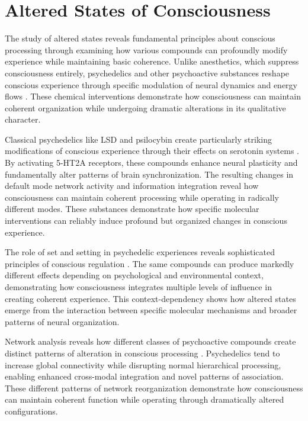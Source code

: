 \section{Altered States of Consciousness}

The study of altered states reveals fundamental principles about conscious processing through examining how various compounds can profoundly modify experience while maintaining basic coherence. Unlike anesthetics, which suppress consciousness entirely, psychedelics and other psychoactive substances reshape conscious experience through specific modulation of neural dynamics and energy flows \cite{CarhartHarris2019}. These chemical interventions demonstrate how consciousness can maintain coherent organization while undergoing dramatic alterations in its qualitative character.

Classical psychedelics like LSD and psilocybin create particularly striking modifications of conscious experience through their effects on serotonin systems \cite{Nichols2016}. By activating 5-HT2A receptors, these compounds enhance neural plasticity and fundamentally alter patterns of brain synchronization. The resulting changes in default mode network activity and information integration reveal how consciousness can maintain coherent processing while operating in radically different modes. These substances demonstrate how specific molecular interventions can reliably induce profound but organized changes in conscious experience.

The role of set and setting in psychedelic experiences reveals sophisticated principles of conscious regulation \cite{Zinberg1984}. The same compounds can produce markedly different effects depending on psychological and environmental context, demonstrating how consciousness integrates multiple levels of influence in creating coherent experience. This context-dependency shows how altered states emerge from the interaction between specific molecular mechanisms and broader patterns of neural organization.

Network analysis reveals how different classes of psychoactive compounds create distinct patterns of alteration in conscious processing \cite{Preller2018}. Psychedelics tend to increase global connectivity while disrupting normal hierarchical processing, enabling enhanced cross-modal integration and novel patterns of association. These different patterns of network reorganization demonstrate how consciousness can maintain coherent function while operating through dramatically altered configurations.

